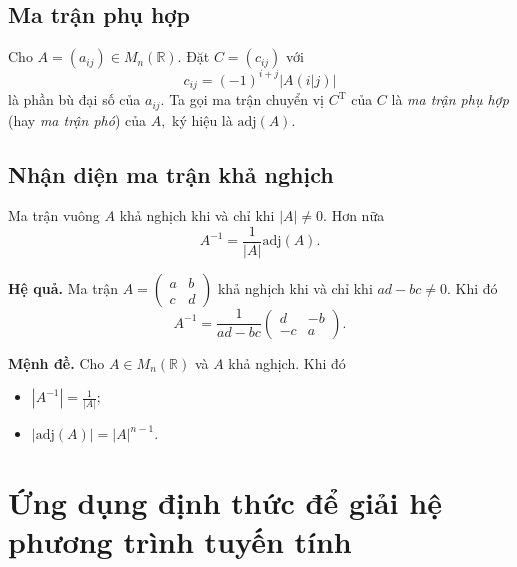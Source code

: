 \subsection{Ma trận phụ hợp}
Cho $A = \left( {a_{ij}} \right) \in M_n \left( {\mathbb{R}} \right).$ Đặt $C = \left( {c_{ij}} \right)$ với
$${c_{ij}} = {\left( { - 1} \right)^{i + j}}\left| {A\left( {\left. i \right|j} \right)} \right|$$
là phần bù đại số của $a_{ij}.$ Ta gọi ma trận chuyển vị $C^{\mathrm{T}}$ của $C$ là \textit{ma trận phụ hợp} (hay \textit{ma trận phó}) của $A,$ ký hiệu là $\mathrm{adj} \left( A \right).$
\subsection{Nhận diện ma trận khả nghịch}
\begin{mybox}
\begin{theorem}
Ma trận vuông $A$ khả nghịch khi và chỉ khi $\left| A \right| \ne 0.$ Hơn nữa
$${A^{ - 1}} = \frac{1}{{\left| A \right|}}\mathrm{adj}\left( A \right).$$
\end{theorem}
\end{mybox}
\textbf{Hệ quả.} Ma trận $A = \left( {\begin{array}{*{20}{c}}
  a&b \\ 
  c&d 
\end{array}} \right)$ khả nghịch khi và chỉ khi $ad - bc \ne 0.$ Khi đó
$${A^{ - 1}} = \frac{1}{{ad - bc}}\left( {\begin{array}{*{20}{c}}
  d&{ - b} \\ 
  { - c}&a 
\end{array}} \right).$$
\begin{mybox}
\textbf{Mệnh đề.} Cho $A  \in M_n \left( {\mathbb{R}} \right)$ và $A$ khả nghịch. Khi đó
\begin{itemize}
\item $\left| {{A^{ - 1}}} \right| = \frac{1}{{\left| A \right|}};$
\item $\left| {\mathrm{adj}\left( A \right)} \right| = {\left| A \right|^{n - 1}}.$
\end{itemize}
\end{mybox}
\section{Ứng dụng định thức để giải hệ phương trình tuyến tính}
